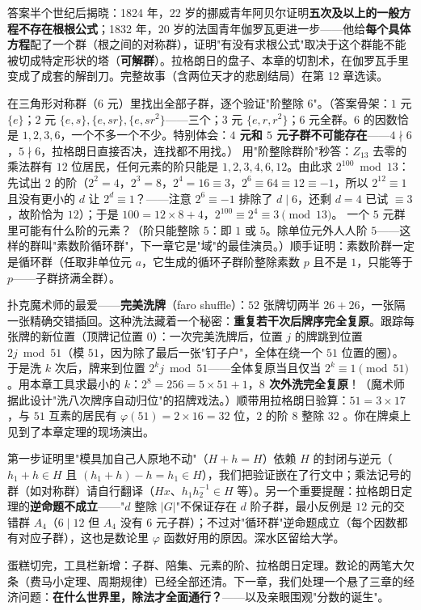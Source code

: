 答案半个世纪后揭晓：1824 年，$22$ 岁的挪威青年阿贝尔证明\textbf{五次及以上的一般方程不存在根根公式}；1832 年，$20$ 岁的法国青年伽罗瓦更进一步——他给\textbf{每个具体方程}配了一个群（根之间的对称群），证明"有没有求根公式"取决于这个群能不能被切成特定形状的塔（\textbf{可解群}）。拉格朗日的盘子、本章的切割术，在伽罗瓦手里变成了成套的解剖刀。完整故事（含两位天才的悲剧结局）在第 12 章选读。

\begin{dongshou}
\begin{itemize}
  \yisi 在三角形对称群（$6$ 元）里找出全部子群，逐个验证"阶整除 $6$"。（答案骨架：$1$ 元 $\{e\}$；$2$ 元 $\{e,s\}, \{e,sr\}, \{e,sr^2\}$——三个；$3$ 元 $\{e,r,r^2\}$；$6$ 元全群。$6$ 的因数恰是 $1,2,3,6$，一个不多一个不少。特别体会：\textbf{$4$ 元和 $5$ 元子群不可能存在}——$4\nmid6$，$5\nmid 6$，拉格朗日直接否决，连找都不用找。）
  \yier 用"阶整除群阶"秒答：$Z_{13}$ 去零的乘法群有 $12$ 位居民，任何元素的阶只能是 $1, 2, 3, 4, 6, 12$。由此求 $2^{100} \bmod 13$：先试出 $2$ 的阶（$2^2=4$，$2^3=8$，$2^4=16\equiv3$，$2^6\equiv 64\equiv 12 \equiv -1$，所以 $2^{12}\equiv1$ 且没有更小的 $d$ 让 $2^d \equiv 1$？——注意 $2^6\equiv -1$ 排除了 $d\mid 6$，还剩 $d = 4$ 已试 $\equiv3$，故阶恰为 $12$）；于是 $100 = 12\times8 + 4$，$2^{100}\equiv 2^4 \equiv 3 \pmod{13}$。
  \yier 一个 $5$ 元群里可能有什么阶的元素？（阶只能整除 $5$：即 $1$ 或 $5$。除单位元外人人阶 $5$——这样的群叫"素数阶循环群"，下一章它是"域"的最佳演员。）顺手证明：素数阶群一定是循环群（任取非单位元 $a$，它生成的循环子群阶整除素数 $p$ 且不是 $1$，只能等于 $p$——子群挤满全群）。
\end{itemize}
\end{dongshou}

\begin{shaonao}
扑克魔术师的最爱——\textbf{完美洗牌}（faro shuffle）：$52$ 张牌切两半 $26+26$，一张隔一张精确交错插回。这种洗法藏着一个秘密：\textbf{重复若干次后牌序完全复原}。跟踪每张牌的新位置（顶牌记位置 $0$）：一次完美洗牌后，位置 $j$ 的牌跳到位置 $2j \bmod 51$（模 $51$，因为除了最后一张"钉子户"，全体在绕一个 $51$ 位置的圈）。于是洗 $k$ 次后，牌来到位置 $2^k j \bmod 51$——全体复原当且仅当 $2^k \equiv 1 \pmod{51}$。用本章工具求最小的 $k$：$2^8 = 256 = 5\times51+1$，\textbf{$8$ 次外洗完全复原}！（魔术师据此设计"洗八次牌序自动归位"的招牌戏法。）顺带用拉格朗日验算：$51 = 3\times17$，与 $51$ 互素的居民有 $\varphi(51) = 2\times16 = 32$ 位，$2$ 的阶 $8$ 整除 $32$ \checkmark。你在牌桌上见到了本章定理的现场演出。
\end{shaonao}

\begin{chengshi}
第一步证明里"模具加自己人原地不动"（$H + h = H$）依赖 $H$ 的封闭与逆元（$h_1 + h \in H$ 且 $(h_1+h) - h = h_1 \in H$），我们把验证嵌在了行文中；乘法记号的群（如对称群）请自行翻译（$Hx$、$h_1h_2^{-1}\in H$ 等）。另一个重要提醒：拉格朗日定理的\textbf{逆命题不成立}——"$d$ 整除 $|G|$"不保证存在 $d$ 阶子群，最小反例是 $12$ 元的交错群 $A_4$（$6\mid 12$ 但 $A_4$ 没有 $6$ 元子群）；不过对"循环群"逆命题成立（每个因数都有对应子群），这也是数论里 $\varphi$ 函数好用的原因。深水区留给大学。
\end{chengshi}

蛋糕切完，工具栏新增：子群、陪集、元素的阶、拉格朗日定理。数论的两笔大欠条（费马小定理、周期规律）已经全部还清。下一章，我们处理一个悬了三章的经济问题：\textbf{在什么世界里，除法才全面通行？}——以及亲眼围观"分数的诞生"。
